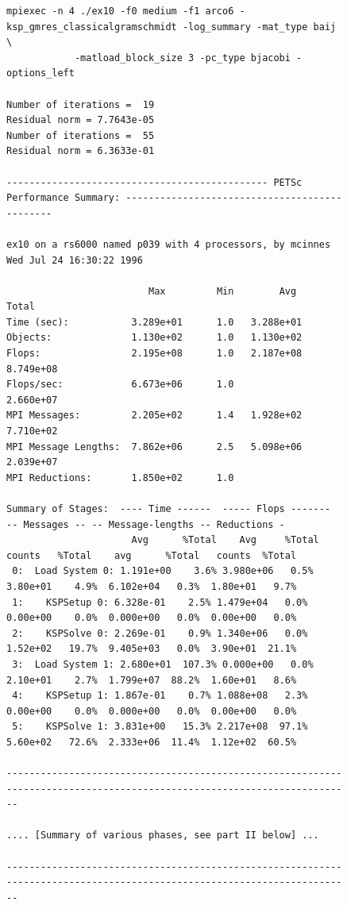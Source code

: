 \begin{figure}[tb]
{\tiny
\begin{verbatim}
mpiexec -n 4 ./ex10 -f0 medium -f1 arco6 -ksp_gmres_classicalgramschmidt -log_summary -mat_type baij \
            -matload_block_size 3 -pc_type bjacobi -options_left

Number of iterations =  19
Residual norm = 7.7643e-05
Number of iterations =  55
Residual norm = 6.3633e-01

---------------------------------------------- PETSc Performance Summary: ----------------------------------------------

ex10 on a rs6000 named p039 with 4 processors, by mcinnes Wed Jul 24 16:30:22 1996

                         Max         Min        Avg        Total
Time (sec):           3.289e+01      1.0   3.288e+01
Objects:              1.130e+02      1.0   1.130e+02
Flops:                2.195e+08      1.0   2.187e+08   8.749e+08
Flops/sec:            6.673e+06      1.0               2.660e+07
MPI Messages:         2.205e+02      1.4   1.928e+02   7.710e+02
MPI Message Lengths:  7.862e+06      2.5   5.098e+06   2.039e+07
MPI Reductions:       1.850e+02      1.0

Summary of Stages:  ---- Time ------  ----- Flops -------  -- Messages -- -- Message-lengths -- Reductions -
                      Avg      %Total    Avg     %Total   counts   %Total    avg      %Total   counts  %Total
 0:  Load System 0: 1.191e+00    3.6% 3.980e+06   0.5%  3.80e+01    4.9%  6.102e+04   0.3%  1.80e+01   9.7%
 1:    KSPSetup 0: 6.328e-01    2.5% 1.479e+04   0.0%  0.00e+00    0.0%  0.000e+00   0.0%  0.00e+00   0.0%
 2:    KSPSolve 0: 2.269e-01    0.9% 1.340e+06   0.0%  1.52e+02   19.7%  9.405e+03   0.0%  3.90e+01  21.1%
 3:  Load System 1: 2.680e+01  107.3% 0.000e+00   0.0%  2.10e+01    2.7%  1.799e+07  88.2%  1.60e+01   8.6%
 4:    KSPSetup 1: 1.867e-01    0.7% 1.088e+08   2.3%  0.00e+00    0.0%  0.000e+00   0.0%  0.00e+00   0.0%
 5:    KSPSolve 1: 3.831e+00   15.3% 2.217e+08  97.1%  5.60e+02   72.6%  2.333e+06  11.4%  1.12e+02  60.5%

------------------------------------------------------------------------------------------------------------------------

.... [Summary of various phases, see part II below] ...

------------------------------------------------------------------------------------------------------------------------


\end{verbatim}}
\end{figure}
